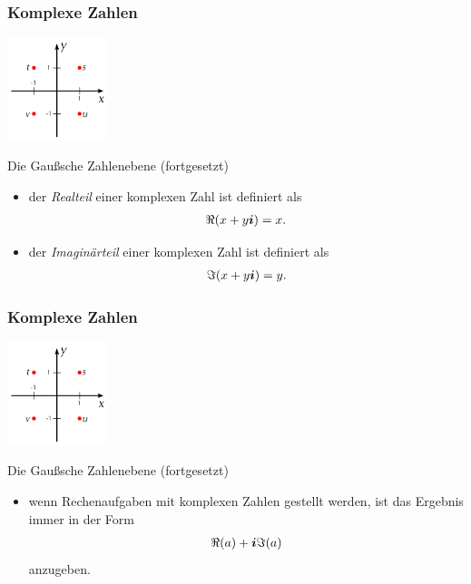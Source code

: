 \documentclass{beamer}
\def\vec#1{\mathchoice{\mbox{\boldmath$\displaystyle#1$}}
{\mbox{\boldmath$\textstyle#1$}}
{\mbox{\boldmath$\scriptstyle#1$}}
{\mbox{\boldmath$\scriptscriptstyle#1$}}}
\renewcommand{\emph}[1]{{\textcolor{solarizedRed}{\itshape #1}}}
\newcommand\ii{\vec i}
\renewcommand{\ae}{\"a}
\newcommand{\mytitle}{Komplexe Zahlen}
\begin{document}
\begin{frame}\frametitle{\mytitle}
	\hfill\includegraphics[height=30mm]{pics/vectors.pdf}
	\begin{block}{Die Gau\ss sche Zahlenebene (fortgesetzt)}
		\begin{itemize}
			\item der \emph{Realteil} einer komplexen Zahl ist definiert als
				\begin{align*}
					\Re(x+y\ii)=x.
				\end{align*}
			\item der \emph{Imagin\ae rteil} einer komplexen Zahl ist definiert als
				\begin{align*}
					\Im(x+y\ii)=y.
				\end{align*}
		\end{itemize}
	\end{block}
\end{frame}

\begin{frame}\frametitle{\mytitle}
	\hfill\includegraphics[height=30mm]{pics/vectors.pdf}
	\begin{block}{Die Gau\ss sche Zahlenebene (fortgesetzt)}
		\begin{itemize}
			\item wenn Rechenaufgaben mit komplexen Zahlen gestellt werden, ist das Ergebnis immer in der Form
				\begin{align*}
					\Re(a)+\ii\Im(a)
				\end{align*}
				anzugeben.
		\end{itemize}
	\end{block}
\end{frame}
\end{document}
